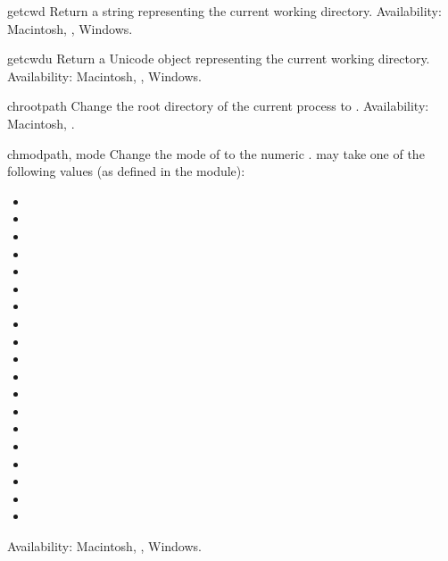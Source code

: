 \begin{funcdesc}{getcwd}{}
Return a string representing the current working directory.
Availability: Macintosh, \UNIX, Windows.
\end{funcdesc}

\begin{funcdesc}{getcwdu}{}
Return a Unicode object representing the current working directory.
Availability: Macintosh, \UNIX, Windows.
\end{funcdesc}

\begin{funcdesc}{chroot}{path}
Change the root directory of the current process to .
Availability: Macintosh, \UNIX.
\end{funcdesc}

\begin{funcdesc}{chmod}{path, mode}
Change the mode of  to the numeric .
 may take one of the following values
(as defined in the  module):
\begin{itemize}
  \item {}
  \item {}
  \item {}
  \item {}
  \item {}
  \item {}
  \item {}
  \item {}
  \item {}
  \item {}
  \item {}
  \item {}
  \item {}
  \item {}
  \item {}
  \item {}
  \item {}
  \item {}
  \item {}
\end{itemize}
Availability: Macintosh, \UNIX, Windows.

\end{funcdesc}

